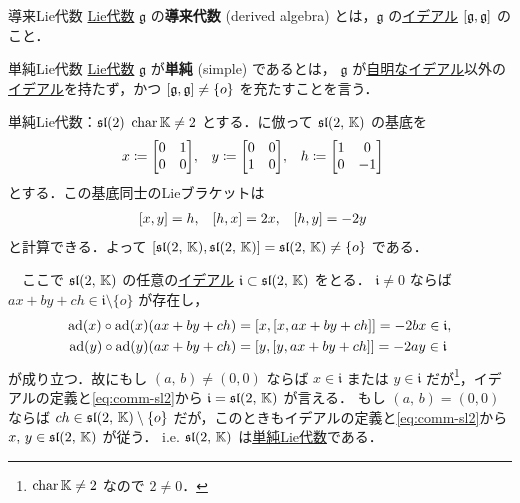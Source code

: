 \documentclass[rep_main]{subfiles}
\begin{document}
\begin{myexample}[label=def:derived-LieAlg]{導来Lie代数}
    \hyperref[ax:LieAlg]{Lie代数} $\mathfrak{g}$ の\textbf{導来代数} (derived algebra) とは，$\mathfrak{g}$ の\hyperref[def:ideal-LieAlg]{イデアル} $\comm{\mathfrak{g}}{\mathfrak{g}}$ のこと．
\end{myexample}

\begin{mydef}[label=def:simple-LieAlg]{単純Lie代数}
    \hyperref[ax:LieAlg]{Lie代数} $\mathfrak{g}$ が\textbf{単純} (simple) であるとは，
    $\mathfrak{g}$ が\hyperref[def:trivialIdeal-LieAlg]{自明なイデアル}以外の\hyperref[def:ideal-LieAlg]{イデアル}を持たず，かつ $\comm{\mathfrak{g}}{\mathfrak{g}} \neq \{o\}$ を充たすことを言う．
\end{mydef}

\begin{myexample}[label=ex:sl2]{単純Lie代数：$\mathfrak{sl} (2)$}
    $\operatorname{char} \mathbb{K} \neq 2$ とする．に倣って $\mathfrak{sl}(2,\, \mathbb{K})$ の基底を
    \begin{align}
        x &\coloneqq \mqty[0 & 1 \\ 0&0], & y &\coloneqq \mqty[0&0 \\ 1 &0], & h &\coloneqq \mqty[1 & 0 \\ 0 & -1]
    \end{align}
    とする．この基底同士のLieブラケットは
    \begin{align}
        \label{eq:comm-sl2}
        \comm{x}{y} &= h, & \comm{h}{x} &= 2x, & \comm{h}{y} &= -2y
    \end{align}
    と計算できる．よって $\comm{\Lsl(2,\, \mathbb{K})}{\Lsl(2,\, \mathbb{K})} = \Lsl(2,\, \mathbb{K}) \neq \{o\}$ である．

    　ここで $\mathfrak{sl}(2,\, \mathbb{K})$ の任意の\hyperref[def:ideal-LieAlg]{イデアル} $\mathfrak{i} \subset \mathfrak{sl}(2,\, \mathbb{K})$ をとる．
    $\mathfrak{i} \neq 0$ ならば $ax + by + ch \in \mathfrak{i} \setminus \{o\}$ が存在し，
    \begin{align}
        \ad(x) \circ \ad(x) (ax + by + ch) &= \comm{x}{\comm{x}{ax + by + ch}} = -2bx \in \mathfrak{i}, \\
        \ad(y) \circ \ad(y) (ax + by + ch) &= \comm{y}{\comm{y}{ax + by + ch}} = -2ay \in \mathfrak{i}
    \end{align}
    が成り立つ．故にもし $(a,\, b) \neq (0, 0)$ ならば $x \in \mathfrak{i}$ または $y \in \mathfrak{i}$ だが\footnote{$\operatorname{char} \mathbb{K} \neq 2$ なので $2 \neq 0$．}，イデアルの定義と\eqref{eq:comm-sl2}から $\mathfrak{i} = \mathfrak{sl}(2,\, \mathbb{K})$ が言える．
    もし $(a,\, b) = (0, 0)$ ならば $ch \in \mathfrak{sl}(2,\, \mathbb{K}) \setminus \{o\}$ だが，このときもイデアルの定義と\eqref{eq:comm-sl2}から $x,\, y \in \mathfrak{sl}(2,\, \mathbb{K})$ が従う．
    i.e. $\mathfrak{sl}(2,\, \mathbb{K})$ は\hyperref[def:simple-LieAlg]{単純Lie代数}である．
\end{myexample}
\end{document}
